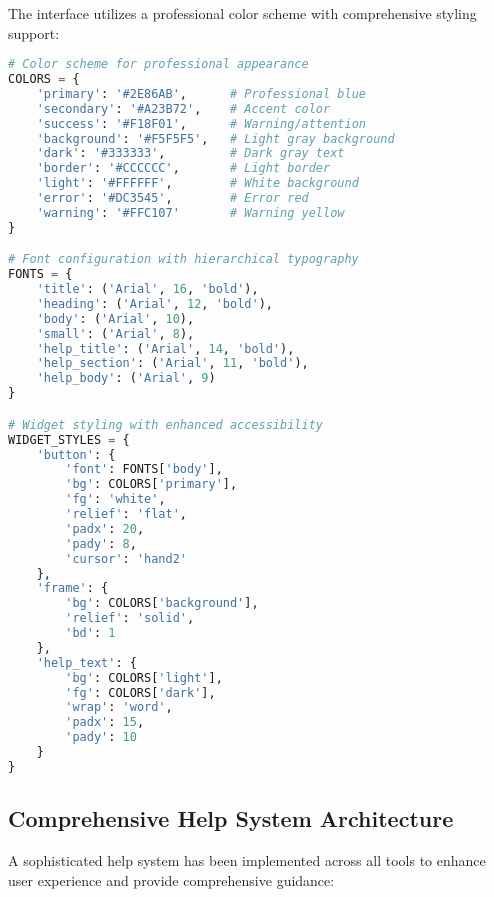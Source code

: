 \documentclass[binding=0.6cm]{sapthesis}
\begin{document}
The interface utilizes a professional color scheme with comprehensive styling support:

\begin{lstlisting}[language=Python, caption=Enhanced UI Styling Configuration]
# Color scheme for professional appearance
COLORS = {
    'primary': '#2E86AB',      # Professional blue
    'secondary': '#A23B72',    # Accent color
    'success': '#F18F01',      # Warning/attention
    'background': '#F5F5F5',   # Light gray background
    'dark': '#333333',         # Dark gray text
    'border': '#CCCCCC',       # Light border
    'light': '#FFFFFF',        # White background
    'error': '#DC3545',        # Error red
    'warning': '#FFC107'       # Warning yellow
}

# Font configuration with hierarchical typography
FONTS = {
    'title': ('Arial', 16, 'bold'),
    'heading': ('Arial', 12, 'bold'),
    'body': ('Arial', 10),
    'small': ('Arial', 8),
    'help_title': ('Arial', 14, 'bold'),
    'help_section': ('Arial', 11, 'bold'),
    'help_body': ('Arial', 9)
}

# Widget styling with enhanced accessibility
WIDGET_STYLES = {
    'button': {
        'font': FONTS['body'],
        'bg': COLORS['primary'],
        'fg': 'white',
        'relief': 'flat',
        'padx': 20,
        'pady': 8,
        'cursor': 'hand2'
    },
    'frame': {
        'bg': COLORS['background'],
        'relief': 'solid',
        'bd': 1
    },
    'help_text': {
        'bg': COLORS['light'],
        'fg': COLORS['dark'],
        'wrap': 'word',
        'padx': 15,
        'pady': 10
    }
}
\end{lstlisting}

\subsection{Comprehensive Help System Architecture}

A sophisticated help system has been implemented across all tools to enhance user experience and provide comprehensive guidance:
\end{document}

